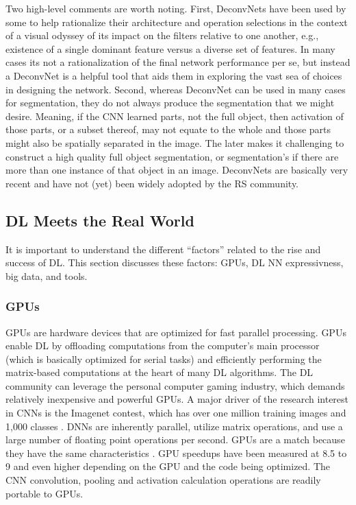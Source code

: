 \documentclass[12pt]{spieman}
\begin{document}
\begin{spacing}{1}
Two high-level comments are worth noting. First, DeconvNets have been used by some to help rationalize their architecture and operation selections in the context of a visual odyssey of its impact on the filters relative to one another, e.g., existence of a single dominant feature versus a diverse set of features. In many cases its not a rationalization of the final network performance per se, but instead a DeconvNet is a helpful tool that aids them in exploring the vast sea of choices in designing the network. Second, whereas DeconvNet can be used in many cases for segmentation, they do not always produce the segmentation that we might desire. Meaning, if the CNN learned parts, not the full object, then activation of those parts, or a subset thereof, may not equate to the whole and those parts might also be spatially separated in the image. The later makes it challenging to construct a high quality full object segmentation, or segmentation's if there are more than one instance of that object in an image. DeconvNets are basically very recent and have not (yet) been widely adopted by the RS community.

\subsection{DL Meets the Real World}
It is important to understand the different ``factors'' related to the rise and success of DL. This section discusses these factors: GPUs, DL NN expressivness, big data, and tools.  

\subsubsection{GPUs}
GPUs are hardware devices that are optimized for fast parallel processing. GPUs enable DL by offloading computations from the computer's main processor (which is basically optimized for serial tasks) and efficiently performing the matrix-based computations at the heart of many DL algorithms.  The DL community can leverage the personal computer gaming industry, which demands relatively inexpensive and powerful GPUs. A major driver of the research interest in CNNs is the Imagenet contest, which has over one million training images and 1,000 classes  \cite{russakovsky2015imagenet} . DNNs are inherently parallel, utilize matrix operations, and use a large number of floating point operations per second. GPUs are a match because they have the same characteristics \cite{Brown2015Deep} . GPU speedups have been measured at 8.5 to 9 \cite{Brown2015Deep} and even higher depending on the GPU and the code being optimized. The CNN convolution, pooling and activation calculation operations are readily portable to GPUs. 


\end{spacing}
\end{document}
